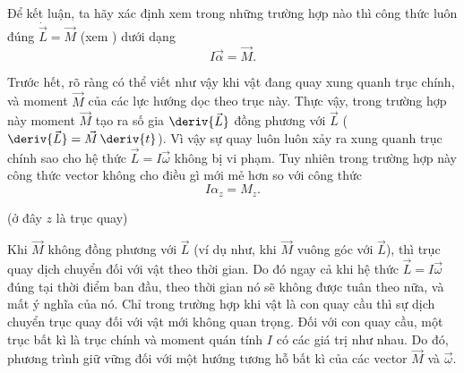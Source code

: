 Để kết luận, ta hãy xác định xem trong những trường hợp nào thì công thức luôn đúng $\dot{\vec{L}}=\vec{M}$ (xem ) dưới dạng
\begin{equation}\label{eq:5_44}
I \vec{\alpha} = \vec{M}.
\end{equation}

Trước hết, rõ ràng có thể viết như vậy khi vật đang quay xung quanh trục chính, và moment $\vec{M}$ của các lực hướng dọc theo trục này. Thực vậy, trong trường hợp này moment $\vec{M}$ tạo ra số gia $\deriv{\vec{L}}$ đồng phương với $\vec{L}$ ($\deriv{\vec{L}}=\vec{M}\,\deriv{t}$). Vì vậy sự quay luôn luôn xảy ra xung quanh trục chính sao cho hệ thức $\vec{L}=I\vec{\omega}$ không bị vi phạm. Tuy nhiên trong trường hợp này công thức vector  không cho điều gì mới mẻ hơn so với công thức
\begin{equation}\label{eq:5_45}
	I\alpha_z = M_z.
\end{equation}

\noindent
(ở đây $z$ là trục quay)

Khi $\vec{M}$ không đồng phương với $\vec{L}$ (ví dụ như, khi $\vec{M}$ vuông góc với $\vec{L}$), thì trục quay dịch chuyển đối với vật theo thời gian. Do đó ngay cả khi hệ thức $\vec{L}=I\vec{\omega}$ đúng tại thời điểm ban đầu, theo thời gian nó sẽ không được tuân theo nữa, và  mất ý nghĩa của nó. Chỉ trong trường hợp khi vật là con quay cầu thì sự dịch chuyển trục quay đối với vật mới không quan trọng. Đối với con quay cầu, một trục bất kì là trục chính và moment quán tính $I$ có các giá trị như nhau. Do đó, phương trình  giữ vững đối với một hướng tương hỗ bất kì của các vector $\vec{M}$ và $\vec{\omega}$.

